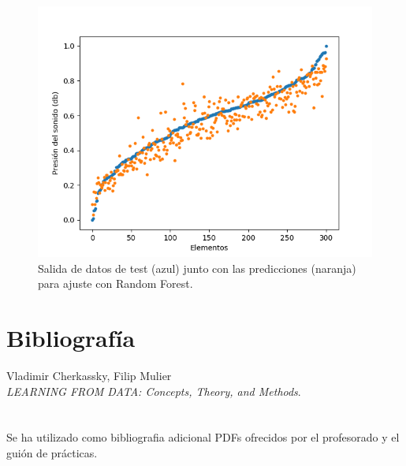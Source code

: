 \documentclass[12pt,spanish]{article} %
\begin{document}
\begin{figure}[H]
  \begin{center}
  \includegraphics[scale=0.8]{s6}
  \caption{Salida de datos de test (azul) junto con las predicciones (naranja) para ajuste con Random Forest.}
  \label{fig:s6}
  \end{center}
\end{figure}

\newpage

\section{Bibliografía}

\noindent
Vladimir Cherkassky, Filip Mulier
\\
\textit{LEARNING FROM DATA: Concepts, Theory, and Methods}.
\\
\\
\\
Se ha utilizado como bibliografia adicional PDFs ofrecidos por el profesorado y el guión de prácticas.

\end{document}
